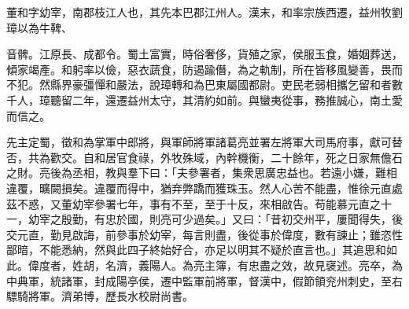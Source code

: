 
\begin{pinyinscope}
董和字幼宰，南郡枝江人也，其先本巴郡江州人。漢末，和率宗族西遷，益州牧劉璋以為牛鞞、

音髀。江原長、成都令。蜀土富實，時俗奢侈，貨殖之家，侯服玉食，婚姻葬送，傾家竭產。和躬率以儉，惡衣蔬食，防遏踰僭，為之軌制，所在皆移風變善，畏而不犯。然縣界豪彊憚和嚴法，說璋轉和為巴東屬國都尉。吏民老弱相攜乞留和者數千人，璋聽留二年，還遷益州太守，其清約如前。與蠻夷從事，務推誠心，南土愛而信之。

先主定蜀，徵和為掌軍中郎將，與軍師將軍諸葛亮並署左將軍大司馬府事，獻可替否，共為歡交。自和居官食祿，外牧殊域，內幹機衡，二十餘年，死之日家無儋石之財。亮後為丞相，教與羣下曰：「夫參署者，集衆思廣忠益也。若遠小嫌，難相違覆，曠闕損矣。違覆而得中，猶弃弊蹻而獲珠玉。然人心苦不能盡，惟徐元直處茲不惑，又董幼宰參署七年，事有不至，至于十反，來相啟告。苟能慕元直之十一，幼宰之殷勤，有忠於國，則亮可少過矣。」又曰：「昔初交州平，屢聞得失，後交元直，勤見啟誨，前參事於幼宰，每言則盡，後從事於偉度，數有諫止；雖恣性鄙暗，不能悉納，然與此四子終始好合，亦足以明其不疑於直言也。」其追思和如此。偉度者，姓胡，名濟，義陽人。為亮主簿，有忠盡之效，故見襃述。亮卒，為中典軍，統諸軍，封成陽亭侯，遷中監軍前將軍，督漢中，假節領兖州刺史，至右驃騎將軍。濟弟博，歷長水校尉尚書。


\end{pinyinscope}